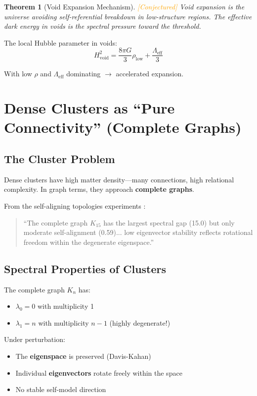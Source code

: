 \documentclass[11pt,a4paper]{article}
\theoremstyle{plain}
\newtheorem{theorem}{Theorem}[section]
\theoremstyle{definition}
\theoremstyle{remark}
\newcommand{\conjectured}{\textcolor{orange}{[Conjectured]}}
\begin{document}
\begin{theorem}[Void Expansion Mechanism] \conjectured
Void expansion is the universe avoiding self-referential breakdown in low-structure regions. The effective dark energy in voids is the spectral pressure toward the threshold.
\end{theorem}

The local Hubble parameter in voids:
\[
H_{\text{void}}^2 = \frac{8\pi G}{3}\rho_{\text{low}} + \frac{\Lambda_{\text{eff}}}{3}
\]

With low $\rho$ and $\Lambda_{\text{eff}}$ dominating $\to$ accelerated expansion.

\section{Dense Clusters as ``Pure Connectivity'' (Complete Graphs)}

\subsection{The Cluster Problem}

Dense clusters have high matter density---many connections, high relational complexity. In graph terms, they approach \textbf{complete graphs}.

From the self-aligning topologies experiments \cite{sat}:
\begin{quote}
``The complete graph $K_{15}$ has the largest spectral gap (15.0) but only moderate self-alignment (0.59)... low eigenvector stability reflects rotational freedom within the degenerate eigenspace.''
\end{quote}

\subsection{Spectral Properties of Clusters}

The complete graph $K_n$ has:
\begin{itemize}[noitemsep]
    \item $\lambda_0 = 0$ with multiplicity 1
    \item $\lambda_1 = n$ with multiplicity $n-1$ (highly degenerate!)
\end{itemize}

Under perturbation:
\begin{itemize}[noitemsep]
    \item The \textbf{eigenspace} is preserved (Davis-Kahan)
    \item Individual \textbf{eigenvectors} rotate freely within the space
    \item No stable self-model direction
\end{itemize}
\end{document}
